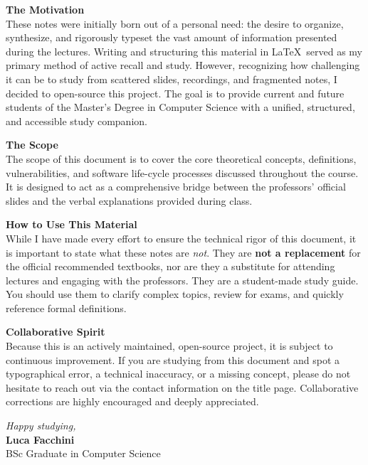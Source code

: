 
\noindent \textbf{The Motivation}\\
These notes were initially born out of a personal need: the desire to organize, synthesize, and rigorously typeset the vast amount of information presented during the lectures. Writing and structuring this material in \LaTeX\ served as my primary method of active recall and study. However, recognizing how challenging it can be to study from scattered slides, recordings, and fragmented notes, I decided to open-source this project. The goal is to provide current and future students of the Master's Degree in Computer Science with a unified, structured, and accessible study companion.

\vspace{1em}
\noindent \textbf{The Scope}\\
The scope of this document is to cover the core theoretical concepts, definitions, vulnerabilities, and software life-cycle processes discussed throughout the course. It is designed to act as a comprehensive bridge between the professors' official slides and the verbal explanations provided during class. 

\vspace{1em}
\noindent \textbf{How to Use This Material}\\
While I have made every effort to ensure the technical rigor of this document, it is important to state what these notes are \textit{not}. They are \textbf{not a replacement} for the official recommended textbooks, nor are they a substitute for attending lectures and engaging with the professors. They are a student-made study guide. You should use them to clarify complex topics, review for exams, and quickly reference formal definitions.

\vspace{1em}
\noindent \textbf{Collaborative Spirit}\\
Because this is an actively maintained, open-source project, it is subject to continuous improvement. If you are studying from this document and spot a typographical error, a technical inaccuracy, or a missing concept, please do not hesitate to reach out via the contact information on the title page. Collaborative corrections are highly encouraged and deeply appreciated.

\vspace{2em}
\noindent \textit{Happy studying,}\\
\textbf{Luca Facchini}\\
BSc Graduate in Computer Science
